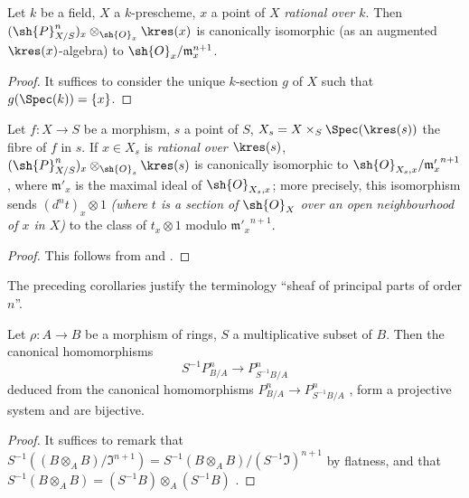 \begin{corollary}[16.4.12]
\label{IV.16.4.12}
Let $k$ be a field, $X$ a $k$-prescheme, $x$ a point of $X$ \emph{rational over $k$}.
Then $(\sh{P}_{X/S}^n)_x \otimes_{\sh{O}_x} \kres(x)$ is canonically isomorphic (as an augmented $\kres(x)$-algebra) to $\sh{O}_x/\mathfrak{m}_x^{n+1}$.
\end{corollary}

\begin{proof}
It suffices to consider the unique $k$-section $g$ of $X$ such that $g(\Spec(k)) = \{x\}$.
\end{proof}

\begin{corollary}[16.4.13]
\label{IV.16.4.13}
Let $f: X \to S$ be a morphism, $s$ a point of $S$, $X_s = X \times_S \Spec(\kres(s))$ the fibre of $f$ in $s$.
If $x \in X_s$ is \emph{rational over $\kres(s)$}, $(\sh{P}_{X/S}^n)_x \otimes_{\sh{O}_s} \kres(s)$ is canonically isomorphic to $\sh{O}_{X_s, x}/{\mathfrak{m}'_x}^{n+1}$, where $\mathfrak{m}'_x$ is the maximal ideal of $\sh{O}_{X_s, x}$;
more precisely, this isomorphism sends $(d^n t)_x \otimes 1$ \emph{(where $t$ is a section of $\sh{O}_X$ over an open neighbourhood of $x$ in $X$)} to the class of $t_x \otimes 1$ modulo ${\mathfrak{m}'_x}^{n+1}$.
\end{corollary}

\begin{proof}
This follows from  and .
\end{proof}

The preceding corollaries justify the terminology ``sheaf of principal parts of order $n$''.

\begin{proposition}[16.4.14]
\label{IV.16.4.14}
Let $\rho:A \to B$ be a morphism of rings, $S$ a multiplicative subset of $B$.
Then the canonical homomorphisms 
\[
  \label{IV.16.4.14.1}
  S^{-1}P_{B/A}^n \to P_{S^{-1}B/A}^n
  \tag{16.4.14.1}
\] 
deduced from the canonical homomorphisms $P_{B/A}^n \to P_{S^{-1}B/A}^n$ , form a projective system and are bijective.
\end{proposition}

\begin{proof}
It suffices to remark that $S^{-1}((B \otimes_A B)/\mathfrak{I}^{n+1}) = S^{-1}(B \otimes_A B)/(S^{-1}\mathfrak{I})^{n+1}$ by flatness, and that $S^{-1}(B \otimes_A B) = (S^{-1}B)\otimes_A (S^{-1}B) $ .
\end{proof}

